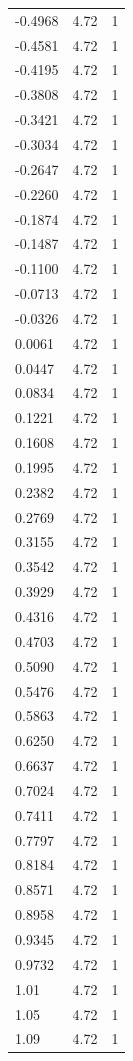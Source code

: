 \begin{longtable}{lrr}
  -0.4968 & 4.72 & 1 \\
  -0.4581 & 4.72 & 1 \\
  -0.4195 & 4.72 & 1 \\
  -0.3808 & 4.72 & 1 \\
  -0.3421 & 4.72 & 1 \\
  -0.3034 & 4.72 & 1 \\
  -0.2647 & 4.72 & 1 \\
  -0.2260 & 4.72 & 1 \\
  -0.1874 & 4.72 & 1 \\
  -0.1487 & 4.72 & 1 \\
  -0.1100 & 4.72 & 1 \\
  -0.0713 & 4.72 & 1 \\
  -0.0326 & 4.72 & 1 \\
  0.0061 & 4.72 & 1 \\
  0.0447 & 4.72 & 1 \\
  0.0834 & 4.72 & 1 \\
  0.1221 & 4.72 & 1 \\
  0.1608 & 4.72 & 1 \\
  0.1995 & 4.72 & 1 \\
  0.2382 & 4.72 & 1 \\
  0.2769 & 4.72 & 1 \\
  0.3155 & 4.72 & 1 \\
  0.3542 & 4.72 & 1 \\
  0.3929 & 4.72 & 1 \\
  0.4316 & 4.72 & 1 \\
  0.4703 & 4.72 & 1 \\
  0.5090 & 4.72 & 1 \\
  0.5476 & 4.72 & 1 \\
  0.5863 & 4.72 & 1 \\
  0.6250 & 4.72 & 1 \\
  0.6637 & 4.72 & 1 \\
  0.7024 & 4.72 & 1 \\
  0.7411 & 4.72 & 1 \\
  0.7797 & 4.72 & 1 \\
  0.8184 & 4.72 & 1 \\
  0.8571 & 4.72 & 1 \\
  0.8958 & 4.72 & 1 \\
  0.9345 & 4.72 & 1 \\
  0.9732 & 4.72 & 1 \\
  1.01 & 4.72 & 1 \\
  1.05 & 4.72 & 1 \\
  1.09 & 4.72 & 1 \\

\end{longtable}
